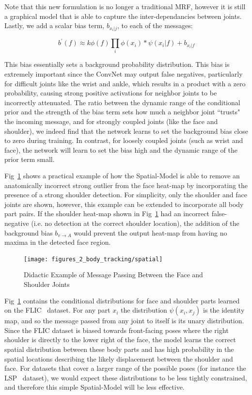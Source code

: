 Note that this new formulation is no longer a traditional MRF, however it is still a graphical model that is able to capture the inter-dependancies between joints.  Lastly, we add a scalar bias term, $b_{x_i|j}$, to each of the messages:

\begin{equation}
b^\prime\left(f\right)\approx k\phi(f)\prod_i \phi(x_i)\ast\psi(x_i|f) + b_{x_i|f}
\label{eq:final_equation}
\end{equation}

This bias essentially sets a background probability distribution. This bias is extremely important since the ConvNet may output false negatives, particularly for difficult joints like the wrist and ankle, which results in a product with a zero probability, causing strong positive activations for neighbor joints to be incorrectly attenuated. The ratio between the dynamic range of the conditional prior and the strength of the bias term sets how much a neighbor joint ``trusts" the incoming message, and for strongly coupled joints (like the face and shoulder), we indeed find that the network learns to set the background bias close to zero during training. In contrast, for loosely coupled joints (such as wrist and face), the network will learn to set the bias high and the dynamic range of the prior term small.

Fig~\ref{fig:heat_map_examples} shows a practical example of how the Spatial-Model is able to remove an anatomically incorrect strong outlier from the face heat-map by incorporating the presence of a strong shoulder detection. For simplicity, only the shoulder and face joints are shown, however, this example can be extended to incorporate all body part pairs. If the shoulder heat-map shown in Fig~\ref{fig:heat_map_examples} had an incorrect false-negative (i.e. no detection at the correct shoulder location), the addition of the background bias $b_{v\rightarrow A}$ would prevent the output heat-map from having no maxima in the detected face region.

\begin{figure}[th]
  \centering
    \texttt{[image: figures\_2\_body\_tracking/spatial]}
    \caption{Didactic Example of Message Passing Between the Face and Shoulder Joints}
  \label{fig:heat_map_examples}
\end{figure}

Fig~\ref{fig:heat_map_examples} contains the conditional distributions for face and shoulder parts learned on the FLIC~\cite{modec} dataset. For any part $x_i$ the distribution $\psi\left(x_i,x_j\right)$ is the identity map, and so the message passed from any joint to itself is its unary distribution. Since the FLIC dataset is biased towards front-facing poses where the right shoulder is directly to the lower right of the face, the model learns the correct spatial distribution between these body parts and has high probability in the spatial locations describing the likely displacement between the shoulder and face. For datasets that cover a larger range of the possible poses (for instance the LSP~\cite{Johnson10} dataset), we would expect these distributions to be less tightly constrained, and therefore this simple Spatial-Model will be less effective. 

